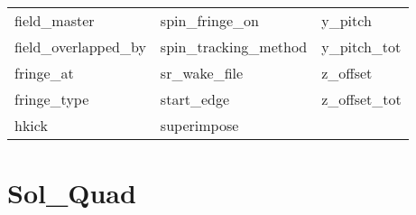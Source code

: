\begin{tabular}{lll}
field_master                & spin_fringe_on              & y_pitch                     \\
field_overlapped_by         & spin_tracking_method        & y_pitch_tot                 \\
fringe_at                   & sr_wake_file                & z_offset                    \\
fringe_type                 & start_edge                  & z_offset_tot                \\
hkick                       & superimpose                 &                             \\
 \bottomrule
 \end{tabular}
 \vfill
 
 \section{Sol_Quad}
 \label{s:list.sol.quad}
 
